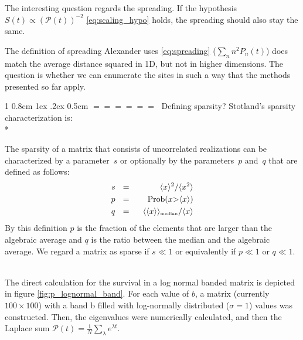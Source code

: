 \documentclass[onecolumn,fleqn,notitlepage,secnumarabic]{revtex4}
\makeatletter
\newcommand{\tbox}[1]{\mbox{\tiny #1}}
\newenvironment{fminipage}%
  {\begin{Sbox}\begin{minipage}}%
  {\end{minipage}\end{Sbox}\fbox{\TheSbox}}
\def\section{%
  \@startsection
    {section}%
    {1}%
    {\z@}%
    {0.8cm \@plus1ex \@minus .2ex}%
    {0.5cm}%
    {\Large\bf $=\!=\!=\!=\!=\!=\;$}%
}%
\newcommand{\dontincludegraphics}[2][]{\texttt{[image: \#2]}}
\makeatother
\begin{document}
The interesting question regards the spreading. If the hypothesis $S(t) \propto \left(\mathcal{P}(t)\right)^{-2}$ \eqref{eq:scaling_hypo} holds, the spreading should also stay the same. 

The definition of spreading Alexander uses \eqref{eq:spreading} ($\sum_n n^2 P_n(t)$) does match the average distance squared in 1D, but not in higher dimensions. The question is whether we can enumerate the sites in such a way that the methods presented so far apply.

\section{Defining sparsity?}
Stotland's \cite{Stotland:2010:PRB}  sparsity characterization is:\\*
\begin{fminipage}{\textwidth}
The sparsity of a matrix that consists of 
uncorrelated realizations can be characterized 
by a parameter~$s$ or optionally 
by the parameters~$p$ and~$q$ that 
are defined as follows: 
%
\begin{align}
s \ \ &=& \ \ \langle x \rangle^2 / \langle x^2 \rangle \\
p \ \ &=& \ \ \mbox{Prob}(x {>} \langle x\rangle) \\
q \ \ &=& \ \ \langle\langle x \rangle\rangle_{\tbox{median}}/\langle x \rangle
\end{align}
%
By this definition $p$ is the fraction of the elements that 
are larger than the algebraic average and $q$ is the ratio between the median
and the algebraic average.
We regard a matrix as sparse if $s\ll1$  
or equivalently if $p \ll 1$ or $q \ll 1$. 

\end{fminipage}
\\

The direct calculation for the survival in a log normal banded matrix is depicted in figure \ref{fig:p_lognormal_band}. For each value of $b$, a matrix (currently $100
\times 100$) with a band b filled with log-normally distributed ($\sigma=1$) values was constructed. Then, the eigenvalues were numerically calculated, and then the Laplace sum $\mathcal{P}(t) =\frac{1}{N}\sum_\lambda e^{\lambda t}$.
\end{document}
